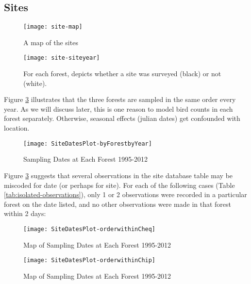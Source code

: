 \subsection{Sites}






\begin{figure}
\texttt{[image: site-map]}
\caption{A map of the sites}
\label{fig:site-map}
\end{figure}


\begin{figure}
\texttt{[image: site-siteyear]}
\caption{For each forest, depicts whether a site was surveyed (black) or not (white).}
\label{fig:site-siteyear}
\end{figure}

Figure \ref{fig:SiteDatesPlot-byForestbyYear} illustrates that the three forests are sampled in the same order every year.  As we will discuss later, this is one reason to model bird counts in each forest separately.  Otherwise, seasonal effects (julian dates) get confounded with location.

\begin{figure}
\texttt{[image: SiteDatesPlot-byForestbyYear]}
\caption{Sampling Dates at Each Forest 1995-2012}
\label{fig:SiteDatesPlot-byForestbyYear}
\end{figure}

Figure \ref{fig:SiteDatesPlot-byForestbyYear} suggests that several observations in the site database table may be miscoded for date (or perhaps for site).  For each of the following cases (Table \ref{tab:isolated-observations}), only 1 or 2 observations were recorded in a particular forest on the date listed, and no other observations were made in that forest within 2 days:



\begin{figure}
\texttt{[image: SiteDatesPlot-orderwithinCheq]}
\caption{Map of Sampling Dates at Each Forest 1995-2012}
\label{fig:SiteDatesPlot-orderwithinCheq}
\end{figure}

\begin{figure}
\texttt{[image: SiteDatesPlot-orderwithinChip]}
\caption{Map of Sampling Dates at Each Forest 1995-2012}
\label{fig:SiteDatesPlot-orderwithinChip}
\end{figure}

